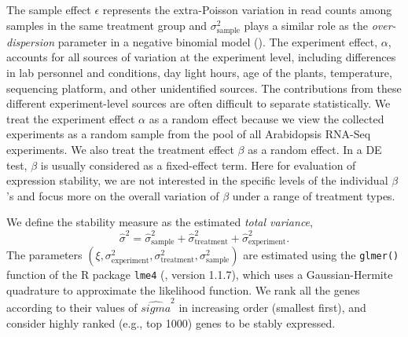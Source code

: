 \documentclass[letterpaper,12pt]{article}
\begin{document}
The sample effect $\epsilon$ represents the
extra-Poisson variation in read counts among samples in the same treatment
group and $\sigma_{\text{sample}}^2$ plays a similar role as the
\textit{over-dispersion} parameter in a negative binomial model
(\citealt{anders2010differential,di2011nbp}). 
The experiment effect, $\alpha$, accounts for all sources of variation at
the experiment level, including differences in lab personnel and conditions,
day light hours, age of the plants, temperature, sequencing platform, and
other unidentified sources. The contributions from these different
experiment-level sources are often difficult to separate statistically. We
treat the experiment effect $\alpha$ as a random effect because we view the
collected experiments as a random sample from the pool of all Arabidopsis
RNA-Seq experiments. We also treat the treatment effect $\beta$ as a random
effect.  In a DE test, $\beta$ is usually considered as a fixed-effect term.
Here for evaluation of expression stability, we are not interested in the
specific levels of the individual $\beta$'s and focus more on the overall
variation of $\beta$ under a range of treatment types.

%

We define the stability measure as the estimated \textit{total variance},
 \begin{equation}\label{eq:totalVariance}
 \hat \sigma^2 =\hat\sigma_{\text{sample}}^2+ \hat\sigma_{\text{treatment}}^2+ \hat\sigma_{\text{experiment}}^2.
 \end{equation}
The parameters $(\xi, \sigma_{\text{experiment}}^2,
\sigma_{\text{treatment}}^2, \sigma_{\text{sample}}^2)$ are estimated using the
\verb|glmer()| function of the R package \verb"lme4" (\cite{bates2012lme4},
version 1.1.7), which uses a Gaussian-Hermite quadrature to approximate the
likelihood function. 
We rank all the genes according to their values of $\hat{sigma}^2$ in increasing order (smallest first), and consider highly
ranked (e.g., top 1000) genes to be stably expressed. 
\end{document}
